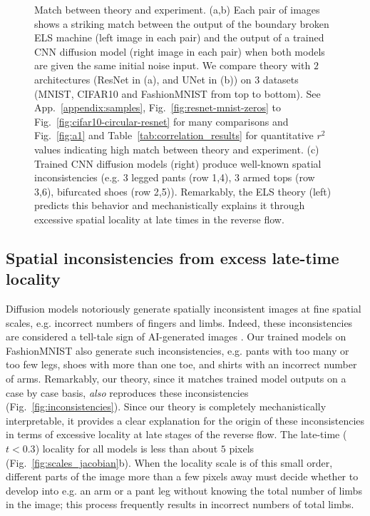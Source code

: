\documentclass{article}
\theoremstyle{plain}
\theoremstyle{definition}
\theoremstyle{remark}
\begin{document}
\begin{figure}[t]
    \caption{Match between theory and experiment. (a,b) Each pair of images shows a striking match between the output of the boundary broken ELS machine (left image in each pair) and the output of a trained CNN diffusion model (right image in each pair) when both models are given the same initial noise input.  We compare theory with $2$ architectures (ResNet in (a), and UNet in (b)) on $3$ datasets (MNIST, CIFAR10 and FashionMNIST from top to bottom). See App.~\ref{appendix:samples}, Fig.~\ref{fig:resnet-mnist-zeros} to Fig.~\ref{fig:cifar10-circular-resnet} for many comparisons and Fig.~\ref{fig:a1} and Table~\ref{tab:correlation_results} for quantitative $r^2$ values indicating high match between theory and experiment. (c) Trained CNN diffusion models (right) produce well-known spatial inconsistencies (e.g. 3 legged pants (row 1,4), 3 armed tops (row 3,6), bifurcated shoes (row 2,5)). Remarkably, the ELS theory (left) predicts this behavior and mechanistically explains it through excessive spatial locality at late times in the reverse flow.} \vspace{-1em}
    \label{fig:enter-label}
\end{figure}

\subsection{Spatial inconsistencies from excess late-time locality}

Diffusion models notoriously generate spatially inconsistent images at fine spatial scales, e.g. incorrect numbers of fingers and limbs. Indeed, these inconsistencies are considered a tell-tale sign of AI-generated images \cite{bird2024cifake, shen2024rethinking, lin2024detecting}. Our trained models on FashionMNIST also generate such inconsistencies, e.g. pants with too many or too few legs, shoes with more than one toe, and shirts with an incorrect number of arms. Remarkably, our theory, since it matches trained model outputs on a case by case basis, {\it also} reproduces these inconsistencies (Fig.~\ref{fig:inconsistencies}). Since our theory is completely mechanistically interpretable, it provides a clear explanation for the origin of these inconsistencies in terms of excessive locality at late stages of the reverse flow. The late-time ($t < 0.3$) locality for all models is less than about $5$ pixels (Fig.~\ref{fig:scales_jacobian}b). When the locality scale is of this small order, different parts of the image more than a few pixels away must decide whether to develop into e.g. an arm or a pant leg without knowing the total number of limbs in the image; this process frequently results in incorrect numbers of total limbs. 
\end{document}

